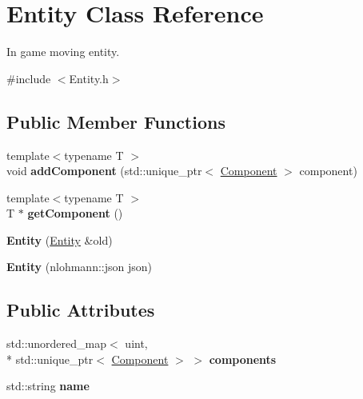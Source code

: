 \hypertarget{classEntity}{\section{Entity Class Reference}
\label{classEntity}
}


In game moving entity.  




{\ttfamily \#include $<$Entity.\-h$>$}

\subsection*{Public Member Functions}
\begin{DoxyCompactItemize}
\item 
\hypertarget{classEntity_afb2d2dd5bbd30e71802726cd45d630ae}{{\footnotesize template$<$typename T $>$ }\\void {\bfseries add\-Component} (std\-::unique\-\_\-ptr$<$ \hyperlink{classComponent}{Component} $>$ component)}\label{classEntity_afb2d2dd5bbd30e71802726cd45d630ae}

\item 
\hypertarget{classEntity_a369c207eab2aed48053346a58b4cdbe2}{{\footnotesize template$<$typename T $>$ }\\T $\ast$ {\bfseries get\-Component} ()}\label{classEntity_a369c207eab2aed48053346a58b4cdbe2}

\item 
\hypertarget{classEntity_ad42e3c93df543d22f2bbc8f301fe90d7}{{\bfseries Entity} (\hyperlink{classEntity}{Entity} \&old)}\label{classEntity_ad42e3c93df543d22f2bbc8f301fe90d7}

\item 
\hypertarget{classEntity_a897eef416e1bdc1ab34349caac9da97f}{{\bfseries Entity} (nlohmann\-::json json)}\label{classEntity_a897eef416e1bdc1ab34349caac9da97f}

\end{DoxyCompactItemize}
\subsection*{Public Attributes}
\begin{DoxyCompactItemize}
\item 
\hypertarget{classEntity_ab706f432d78dd17aebad2a6b0fadefac}{std\-::unordered\-\_\-map$<$ uint, \\*
std\-::unique\-\_\-ptr$<$ \hyperlink{classComponent}{Component} $>$ $>$ {\bfseries components}}\label{classEntity_ab706f432d78dd17aebad2a6b0fadefac}

\item 
\hypertarget{classEntity_a931b21fbdebb1a5963b4bcab5df128f5}{std\-::string {\bfseries name}}\label{classEntity_a931b21fbdebb1a5963b4bcab5df128f5}

\end{DoxyCompactItemize}
